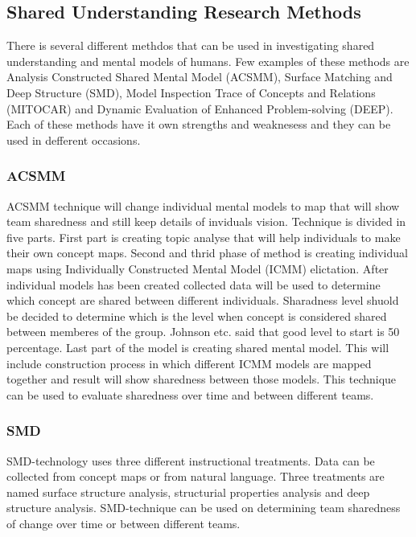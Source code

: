 \documentclass[english]{tktltiki2}
\theoremstyle{definition}
\theoremstyle{remark}
\begin{document}
\subsection{Shared Understanding Research Methods}

There is several different methdos that can be used in investigating shared understanding and mental models of humans. Few examples of these methods are Analysis Constructed Shared Mental Model (ACSMM), Surface Matching and Deep Structure (SMD), Model Inspection Trace of Concepts and Relations (MITOCAR) and Dynamic Evaluation of Enhanced Problem-solving (DEEP). Each of these methods have it own strengths and weaknesess and they can be used in defferent occasions\cite{mentalModelResearch}.

\subsubsection{ACSMM}

ACSMM technique will change individual mental models to map that will show team sharedness and still keep details of inviduals vision. Technique is divided in five parts. First part is creating topic analyse that will help  individuals to make their own concept maps. Second and thrid phase of method is creating individual maps using Individually Constructed Mental Model (ICMM) elictation. After individual models has been created collected data will be used to determine which concept are shared between different individuals. Sharadness level shuold be decided to determine which is the level when concept is considered shared between memberes of the group. Johnson etc. said that good level to start is 50 percentage\cite{mentalModelResearch}. Last part of the model is creating shared mental model. This will include construction process in which different ICMM models are mapped together and result will show sharedness between those models. This technique can be used to evaluate sharedness over time and between different teams\cite{mentalModelResearch}.

\subsubsection{SMD}

SMD-technology uses three different instructional treatments. Data can be collected from concept maps or from natural language. Three treatments are named surface structure analysis, structurial properties analysis and deep structure analysis. SMD-technique can be used on determining team sharedness of change over time or between different teams\cite{mentalModelResearch}.
\end{document}
